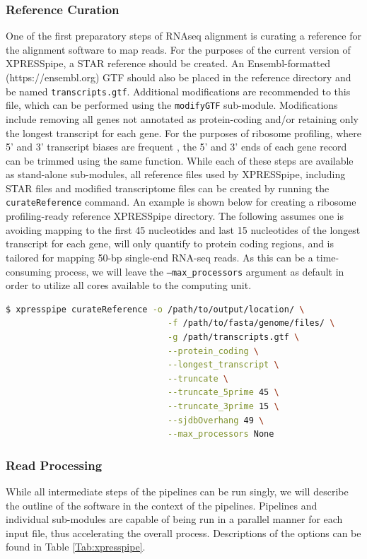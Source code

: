 \documentclass[11pt, a4paper, oneside]{article}
\begin{document}
\subsubsection{Reference Curation}
One of the first preparatory steps of RNAseq alignment is curating a reference for the alignment software to map reads. For the purposes of the current version of XPRESSpipe, a STAR \cite{star} reference should be created. An Ensembl-formatted (https://ensembl.org) GTF should also be placed in the reference directory and be named \texttt{transcripts.gtf}. Additional modifications are recommended to this file, which can be performed using the \texttt{modifyGTF} sub-module. Modifications include removing all genes not annotated as protein-coding and/or retaining only the longest transcript for each gene. For the purposes of ribosome profiling, where 5' and 3' transcript biases are frequent \cite{ingolia_meth, weinberg_reports}, the 5' and 3' ends of each gene record can be trimmed using the same function. While each of these steps are available as stand-alone sub-modules, all reference files used by XPRESSpipe, including STAR files and modified transcriptome files can be created by running the \texttt{curateReference} command. An example is shown below for creating a ribosome profiling-ready reference XPRESSpipe directory. The following assumes one is avoiding mapping to the first 45 nucleotides and last 15 nucleotides of the longest transcript for each gene, will only quantify to protein coding regions, and is tailored for mapping 50-bp single-end RNA-seq reads. As this can be a time-consuming process, we will leave the \texttt{--max\_processors} argument as default in order to utilize all cores available to the computing unit.
\newline
\begin{lstlisting}[language=bash, caption=curateReference example]
$ xpresspipe curateReference -o /path/to/output/location/ \
                                -f /path/to/fasta/genome/files/ \
                                -g /path/transcripts.gtf \
                                --protein_coding \
                                --longest_transcript \
                                --truncate \
                                --truncate_5prime 45 \
                                --truncate_3prime 15 \
                                --sjdbOverhang 49 \
                                --max_processors None
\end{lstlisting}

\subsubsection{Read Processing}
While all intermediate steps of the pipelines can be run singly, we will describe the outline of the software in the context of the pipelines. Pipelines and individual sub-modules are capable of being run in a parallel manner for each input file, thus accelerating the overall process. Descriptions of the options can be found in Table \ref{Tab:xpresspipe}.
\end{document}
